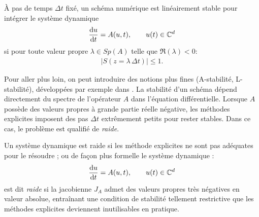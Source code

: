 \begin{definition}
    À pas de temps $\Delta t$ fixé, un schéma numérique est linéairement stable pour intégrer le système dynamique
    \begin{align}
    \frac{\text d u}{\text d t} = A(u,t), \qquad u(t)\in\mathbb{C}^d
    \end{align}
    si pour toute
    valeur propre $\lambda \in Sp(A)$ telle que $\Re(\lambda) < 0$: 
    \begin{align}
        \left\vert S(z = \lambda \, \Delta t) \right\vert \leq 1.
    \end{align}
\end{definition}
Pour aller plus loin, on peut introduire des notions plus fines (A-stabilité, L-stabilité), développées par exemple dans \cite{HairerAndWanner1,MassotSeries2023}.
La stabilité d'un schéma dépend directement du spectre de l'opérateur $A$ dans l'équation différentielle.
Lorsque $A$ possède des valeurs propres à grande partie réelle négative, les méthodes explicites imposent des pas $\Delta t$ extrêmement petits pour rester stables.  
Dans ce cas, le problème est qualifié de \emph{raide}.

\begin{definition}
Un système dynamique est raide si les méthode explicites ne sont pas adéquates pour le résoudre \cite{HairerAndWanner1} ; ou de façon plus formelle le système dynamique :
\begin{align}
    \frac{\text d u}{\text d t} = A(u,t), \qquad u(t)\in\mathbb{C}^d
\end{align}
est dit \emph{raide} si la jacobienne $J_A$ admet des valeurs propres très négatives en valeur absolue, entraînant une condition de stabilité tellement restrictive que les méthodes explicites deviennent inutilisables en pratique.
\end{definition}




